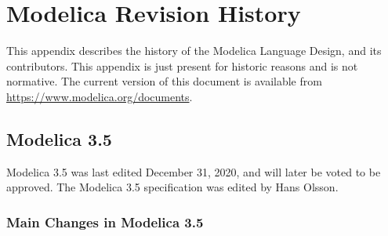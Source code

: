 \chapter{Modelica Revision History}\label{modelica-revision-history}

This appendix describes the history of the Modelica Language Design, and
its contributors. This appendix is just present for historic reasons and
is not normative. The current version of this document is available from
\url{https://www.modelica.org/documents}.

\section{Modelica 3.5}\label{modelica-3-5}

Modelica 3.5 was last edited December 31, 2020, and will later be voted to be approved.
The Modelica 3.5 specification was edited by Hans Olsson.

\subsection{Main Changes in Modelica 3.5}\label{main-changes-in-modelica-3-5}

